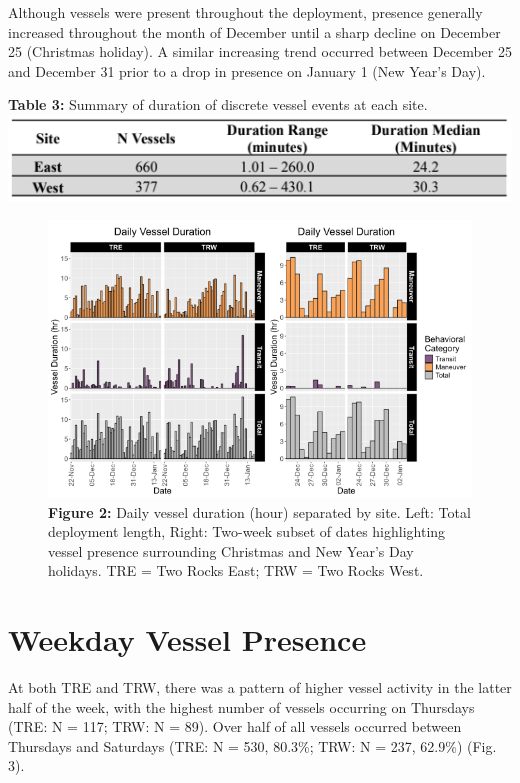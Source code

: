 \documentclass[
  letterpaper,
  oneside,
  open=any]{scrbook}
\begin{document}
Although vessels were present throughout the deployment, presence
generally increased throughout the month of December until a sharp
decline on December 25 (Christmas holiday). A similar increasing trend
occurred between December 25 and December 31 prior to a drop in presence
on January 1 (New Year's Day).

\textbf{Table 3:} Summary of duration of discrete vessel events at each
site. \includegraphics{images/Table.3.PNG}

\hfill\break

\begin{figure}[H]

{\centering \includegraphics{images/Figure.2.PNG}

}

\caption{\textbf{Figure 2:} Daily vessel duration (hour) separated by
site. Left: Total deployment length, Right: Two-week subset of dates
highlighting vessel presence surrounding Christmas and New Year's Day
holidays. TRE = Two Rocks East; TRW = Two Rocks West.}

\end{figure}%

\section{Weekday Vessel Presence}\label{weekday-vessel-presence}

At both TRE and TRW, there was a pattern of higher vessel activity in
the latter half of the week, with the highest number of vessels
occurring on Thursdays (TRE: N = 117; TRW: N = 89). Over half of all
vessels occurred between Thursdays and Saturdays (TRE: N = 530, 80.3\%;
TRW: N = 237, 62.9\%) (Fig. 3).
\end{document}
